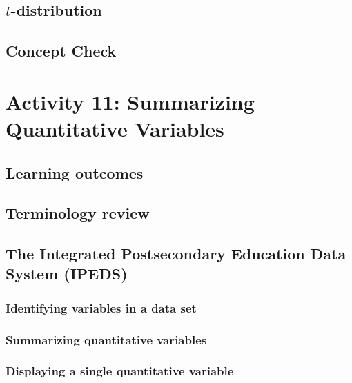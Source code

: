 \documentclass[
]{report}
\begin{document}
\subsection*{\texorpdfstring{\(t\)-distribution}{t-distribution}}\label{t-distribution}

\subsection{Concept Check}\label{concept-check-5}

\section{Activity 11: Summarizing Quantitative Variables}\label{activity-11-summarizing-quantitative-variables}

\subsection{Learning outcomes}\label{learning-outcomes-11}

\subsection{Terminology review}\label{terminology-review-9}

\subsection{The Integrated Postsecondary Education Data System (IPEDS)}\label{the-integrated-postsecondary-education-data-system-ipeds}

\subsubsection*{Identifying variables in a data set}\label{identifying-variables-in-a-data-set}

\subsubsection*{Summarizing quantitative variables}\label{summarizing-quantitative-variables}

\subsubsection*{Displaying a single quantitative variable}\label{displaying-a-single-quantitative-variable}
\end{document}
